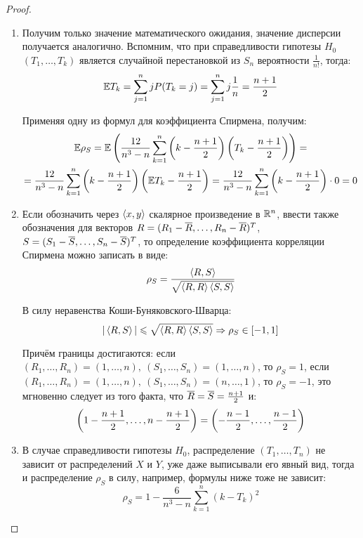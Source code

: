 \begin{proof}~
    \begin{enumerate}
        \item Получим только значение математического ожидания, значение дисперсии получается аналогично. Вспомним, что при справедливости гипотезы $H_0$ $(T_1, \dots, T_k)$ является случайной перестановкой из $S_n$ вероятности $\frac{1}{n!}$, тогда:
        \[
            \mathbb{E} T_k = \sum_{j=1}^n j P(T_k = j) = \sum_{j=1}^n j \frac{1}{n} = \frac{n+1}{2}
        \]

        Применяя одну из формул для коэффициента Спирмена, получим:
        \begin{multline*}
            \mathbb{E} \rho_S = \mathbb{E} \left(\frac{12}{n^3-n} \sum\limits_{k=1}^n \left(k - \frac{n+1}{2}\right) \left(T_k -\frac{n+1}{2}\right)\right) =
            \\
            = \frac{12}{n^3-n} \sum\limits_{k=1}^n \left(k - \frac{n+1}{2}\right) \left(\mathbb{E} T_k -\frac{n+1}{2}\right) = \frac{12}{n^3-n} \sum\limits_{k=1}^n \left(k - \frac{n+1}{2}\right) \cdot 0 = 0
        \end{multline*}
            
        \item Если обозначить через $\left\langle x, y\right\rangle$ скалярное произведение в $\mathbb{R}^n$, ввести также обозначения для векторов $R = (R_1 - \overline{R}, \dots, R_n - \overline{R})^T$, $S = (S_1 - \overline{S}, \dots, S_n - \overline{S})^T$, то определение коэффициента корреляции Спирмена можно записать в виде:
        \[
            \rho_S = \frac{\left\langle R, S\right\rangle}{\sqrt{\left\langle R, R\right\rangle \left\langle S, S\right\rangle}}
        \]

        В силу неравенства Коши-Буняковского-Шварца:
        \[
            |\left\langle R, S\right\rangle| \leqslant \sqrt{\left\langle R, R\right\rangle \left\langle S, S\right\rangle} \Rightarrow \rho_S \in [-1, 1]
        \]

        Причём границы достигаются: если $(R_1, \dots, R_n) = (1, \dots, n),\ (S_1, \dots, S_n) = (1, \dots, n)$, то $\rho_S = 1$, если $(R_1, \dots, R_n) = (1, \dots, n),\ (S_1, \dots, S_n) = (n, \dots, 1)$, то $\rho_S = -1$, это мгновенно следует из того факта, что $\overline{R} = \overline{S} = \frac{n+1}{2}$ и:
        \[
            \left(1 - \frac{n+1}{2}, \dots, n - \frac{n+1}{2}\right) = \left(-\frac{n-1}{2}, \dots, \frac{n-1}{2}\right)
        \]

        \item В случае справедливости гипотезы $H_0$, распределение $(T_1, \dots, T_n)$ не зависит от распределений $X$ и $Y$, уже даже выписывали его явный вид, тогда и распределение $\rho_S$ в силу, например, формулы ниже тоже не зависит:
        \[
            \rho_S = 1 - \frac{6}{n^3-n} \sum\limits_{k=1}^n (k-T_k)^2
        \]


\end{enumerate}
\end{proof}
